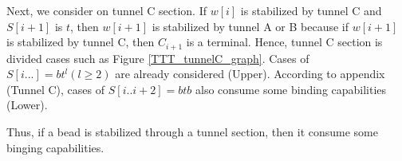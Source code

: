 \documentclass[runningheads]{llncs}
\begin{document}

Next, we consider on tunnel C section. If $w[i]$ is stabilized by tunnel C and $S[i+1]$ is $t$, then $w[i+1]$ is stabilized by tunnel A or B because if $w[i+1]$ is stabilized by tunnel C, then $C_{i+1}$ is a terminal. Hence, tunnel C section is divided cases such as Figure \ref{TTT_tunnelC_graph}. Cases of $S[i...] = bt^l (l \geq 2)$ are already considered (Upper). According to appendix (Tunnel C), cases of $S[i..i+2] = btb$ also consume some binding capabilities (Lower).


Thus, if a bead is stabilized through a tunnel section, then it consume some binging capabilities.
\end{document}
